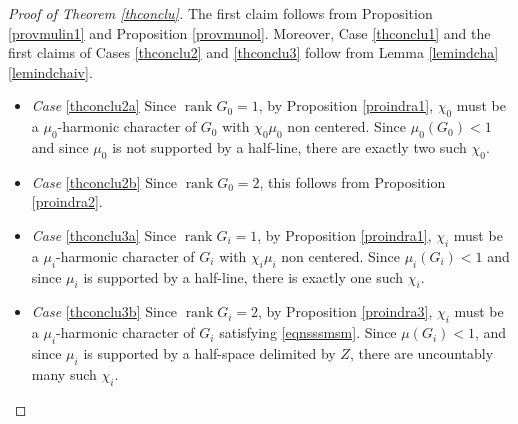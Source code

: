 \documentclass[JEP,XML,SOM,Unicode]{cedram}
\DeclareMathOperator{\rank}{rank}
\theoremstyle{definition}
\begin{document}
\begin{proof}[Proof of Theorem \ref{thconclu}]
The first claim follows from
Proposition \ref{provmulin1} and Proposition \ref{provmunol}. Moreover, Case \eqref{thconclu1}
and
the first claims of Cases \eqref{thconclu2} and \eqref{thconclu3} follow from Lemma \ref{lemindcha}\,\eqref{lemindchaiv}.
\begin{itemize}
\item
\emph{Case} \eqref{thconclu2a} Since $\rank G_0=1$,
by Proposition \ref{proindra1}, $\chi_0$ must be a $\mu_0$-harmonic character
of $G_0$ with $\chi_0\mu_0$ non centered.
Since $\mu_0(G_0)<1$ and since $\mu_0$ is not supported by a half-line,
there are exactly two such $\chi_0$.
\item
\emph{Case} \eqref{thconclu2b} Since $\rank G_0=2$, this follows from Proposition \ref{proindra2}.
\item
\emph{Case} \eqref{thconclu3a} Since $\rank G_i=1$,
by Proposition \ref{proindra1},
$\chi_i$ must be a $\mu_i$-harmonic character of $G_i$
with $\chi_i\mu_i$ non centered.
Since $\mu_i(G_i)<1$ and since $\mu_i$ is supported by a half-line,
there is exactly one such $\chi_i$.
\item
\emph{Case} \eqref{thconclu3b} Since $\rank G_i=2$,
by Proposition \ref{proindra3}, $\chi_i$
must be a $\mu_i$-harmonic character of $G_i$
satisfying \eqref{eqnsssmsm}.
Since $\mu(G_i)<1$, and since $\mu_i$ is supported
by a half-space delimited by $Z$,
there are uncountably many such $\chi_i$.\qedhere
\end{itemize}
\end{proof}
\end{document}
